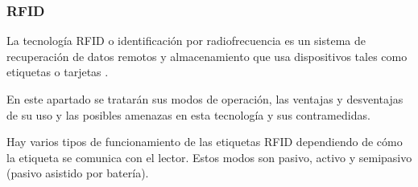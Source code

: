 \documentclass[12pt,a4paper,onecolumn,oneside]{report}
\newcounter{subsubsubsection}[subsubsection]
\begin{document}
\subsubsection{RFID}

La tecnología RFID o identificación por radiofrecuencia es un sistema de recuperación de datos remotos y almacenamiento que usa dispositivos tales como etiquetas o tarjetas .

En este apartado se tratarán sus modos de operación, las ventajas y desventajas de su uso y las posibles amenazas en esta tecnología y sus contramedidas.


Hay varios tipos de funcionamiento de las etiquetas RFID dependiendo de cómo la etiqueta se comunica con el lector. Estos modos son pasivo, activo y semipasivo (pasivo asistido por batería).
\end{document}
